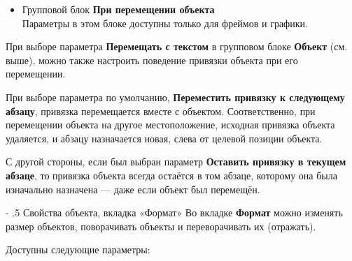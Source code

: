 \documentclass[a4paper,10pt]{article}
\makeatletter
\renewcommand\paragraph{%
   \@startsection{paragraph}{4}{0mm}%
      {-\baselineskip}%
      {.5\baselineskip}%
      {\normalfont\normalsize\bfseries}}
\makeatother
\begin{document}
\begin{itemize}
 \item Групповой блок \textbf{При перемещении объекта}\\
 Параметры в этом блоке доступны только для фреймов и графики.
\end{itemize}

При выборе параметра \textbf{Перемещать с текстом} в групповом блоке \textbf{Объект} (см. выше), можно также настроить поведение привязки объекта при его перемещении.

При выборе параметра по умолчанию, \textbf{Переместить привязку к следующему абзацу}, привязка перемещается вместе с объектом. Соответственно,  при перемещении объекта на другое местоположение, исходная привязка объекта удаляется, и абзацу назначается новая, слева от целевой позиции объекта.

С другой стороны, если был выбран параметр \textbf{Оставить привязку в текущем абзаце}, то привязка объекта всегда остаётся в том абзаце, которому она была изначально назначена --- даже если объект был перемещён.

\paragraph{Свойства объекта, вкладка «Формат»}
Во вкладке \textbf{Формат} можно изменять размер объектов, поворачивать объекты и переворачивать их (отражать).

Доступны следующие параметры:
\end{document}
